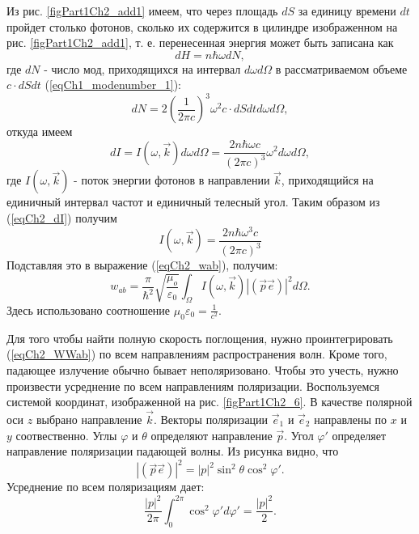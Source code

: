 Из рис. \ref{figPart1Ch2_add1} имеем, что через площадь $dS$ за единицу
времени $dt$ пройдет столько фотонов, сколько их содержится в цилиндре
изображенном на рис. \ref{figPart1Ch2_add1}, т. е. перенесенная
энергия может быть записана как
\[
dH = n \hbar \omega d N ,
\]
где $dN$ -  число мод, приходящихся на интервал $d \omega d \Omega$ в
 рассматриваемом объеме $c \cdot dS  dt$ (\ref{eqCh1_modenumber_1}):
\[
d N = 2 \left(\frac{1}{2 \pi c} \right)^3 \omega^2 
c \cdot dS  dt
d \omega d \Omega,
\]
откуда имеем 
\begin{equation}
d I = I\left(\omega, \vec{k}\right) d \omega d \Omega = 
\frac{2 n \hbar \omega c}{\left(2 \pi c\right)^3}
\omega^2 d \omega d \Omega,
\label{eqCh2_dI}
\end{equation}
где $I\left(\omega, \vec{k}\right)$ - 
поток энергии фотонов в направлении $\vec{k}$,  приходящийся на единичный
интервал частот и единичный телесный угол. Таким образом из
(\ref{eqCh2_dI}) получим 
\begin{equation}
I\left(\omega, \vec{k}\right) = 
\frac{2 n \hbar \omega^3 c}{\left(2 \pi c\right)^3}
\nonumber
\end{equation}
Подставляя это в выражение (\ref{eqCh2_wab}), получим:
\begin{equation}
w_{ab} = \frac{\pi}{\hbar^2}\sqrt{\frac{\mu_o}{\varepsilon_0}}
\int_{\Omega}I\left(\omega, \vec{k}\right)
\left|\left(\vec{p} \vec{e}\right)\right|^2
d \Omega.
\label{eqCh2_WWab}
\end{equation}
Здесь использовано соотношение $\mu_0 \varepsilon_0 = \frac{1}{c^2}$.



Для того чтобы найти полную скорость поглощения, нужно
проинтегрировать (\ref{eqCh2_WWab}) по всем направлениям
распространения волн. Кроме того, падающее излучение обычно бывает 
неполяризовано. Чтобы это учесть, нужно произвести усреднение
по всем направлениям поляризации. Воспользуемся системой
координат, изображенной на рис. \ref{figPart1Ch2_6}. В качестве полярной оси $z$
выбрано направление $\vec{k}$.  Векторы поляризации $\vec{e}_1$ и $\vec{e}_2$ направлены по $x$ и $y$ соотвественно.
Углы $\varphi$ и $\theta$   определяют направление $\vec{p}$. 
Угол $\varphi'$ определяет направление поляризации падающей
волны. Из рисунка видно, что
\[
\left|\left(\vec{p} \vec{e}\right)\right|^2 = 
\left|p\right|^2 \sin^2 \theta \cos^2 \varphi'. 
\]
Усреднение по всем поляризациям дает: 
\begin{equation}
\frac{\left|p\right|^2}{2 \pi} \int_0^{2 \pi}
\cos^2 \varphi' d \varphi' = \frac{\left|p\right|^2}{2}.
\label{eqCh2_PolyarMedian}
\end{equation}

